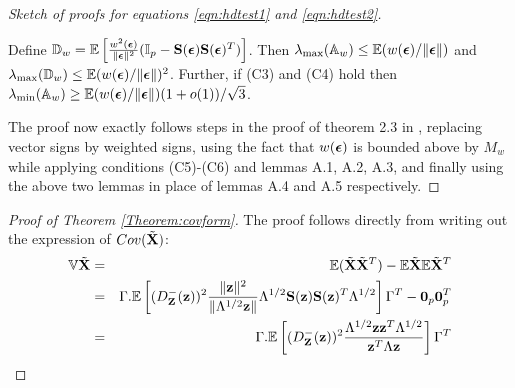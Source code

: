 \begin{proof}[Sketch of proofs for equations \ref{eqn:hdtest1} and \ref{eqn:hdtest2}]
\begin{Lemma}
Define ${\mathbb{D}}_w = {\mathbb{E}} \left[ \frac{w^2({\boldsymbol{\epsilon}})}{\| {\boldsymbol{\epsilon}} \|^2} ({\mathbb{I}}_p - {\mathbf{S}}({\boldsymbol{\epsilon}}) {\mathbf{S}}({\boldsymbol{\epsilon}})^T )\right] $. Then $\lambda_{\max} ({\mathbb{A}}_w) \leq {\mathbb{E}}( w({\boldsymbol{\epsilon}})/\| {\boldsymbol{\epsilon}} \|)$ and $\lambda_{\max} ({\mathbb{D}}_w) \leq {\mathbb{E}}( w({\boldsymbol{\epsilon}})/\| {\boldsymbol{\epsilon}} \|)^2$. Further, if (C3) and (C4) hold then $\lambda_{\min} ({\mathbb{A}}_w) \geq {\mathbb{E}}( w({\boldsymbol{\epsilon}})/\| {\boldsymbol{\epsilon}} \|)(1+o(1))/\sqrt 3$.
\end{Lemma}
%
The proof now exactly follows steps in the proof of theorem 2.3 in \cite{WangPengLi15}, replacing vector signs by weighted signs, using the fact that $w({\boldsymbol{\epsilon}})$ is bounded above by $M_w$ while applying conditions (C5)-(C6) and lemmas A.1, A.2, A.3, and finally using the above two lemmas in place of lemmas A.4 and A.5 respectively.
\end{proof}

\begin{proof}[Proof of Theorem  \ref{Theorem:covform}]
The proof follows directly from writing out the expression of $Cov ( \tilde {{\mathbf{X}}})$:
%
\begin{eqnarray*}
{\mathbb{V}} \tilde{{\mathbf{X}}} &=& {\mathbb{E}} (\tilde{{\mathbf{X}}} \tilde{{\mathbf{X}}}^T) - {\mathbb{E}} \tilde{{\mathbf{X}}} {\mathbb{E}} \tilde{{\mathbf{X}}}^T\\
&=& \Gamma . {\mathbb{E}} \left[ (D^-_{\mathbf{Z}}({\bf{z}}))^2 \frac{\|{\bf{z}}\|^2}{\| \Lambda^{1/2}{\bf{z}}\|} \Lambda^{1/2} {\mathbf{S}}({\bf{z}}) {\mathbf{S}}({\bf{z}})^T \Lambda^{1/2} \right] \Gamma^T - {\bf 0}_p {\bf 0}_p^T\\
&=& \Gamma . {\mathbb{E}} \left[ (D^-_{\mathbf{Z}}({\bf{z}}))^2 \frac{\Lambda^{1/2} {\bf{z}} {\bf{z}}^T \Lambda^{1/2}}{{\bf{z}}^T \Lambda {\bf{z}}} \right] \Gamma^T
\end{eqnarray*}
%
\end{proof}

